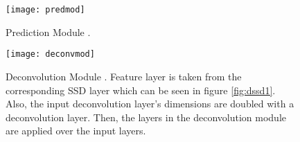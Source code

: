 \documentclass{article}
\begin{document}
\begin{figure}
    \centering
    \texttt{[image: predmod]}
    \caption{Prediction Module \cite{dssdcite}.}
    \label{fig:predmod1}
\end{figure}

\begin{figure}
    \centering
    \texttt{[image: deconvmod]}
    \caption{Deconvolution Module \cite{dssdcite}. Feature layer is 
    taken from the corresponding SSD layer which can be seen in figure 
    \ref{fig:dssd1}. Also, the input deconvolution layer's dimensions 
    are doubled with a deconvolution layer. Then, the layers in the 
    deconvolution module are applied over the input layers.}
    \label{fig:deconvmod1}
\end{figure}
\end{document}
